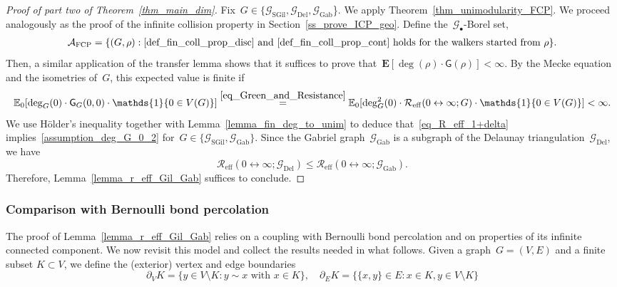 \documentclass[a4paper,11pt]{article}
\newcommand{\EE}{\mathbb{E}}
\theoremstyle{definition}
\begin{document}
\begin{proof}[Proof of part two of Theorem~\ref{thm_main_dim}]


Fix~$G \in \{\mathcal G_\mathrm{SGil},\mathcal G_\mathrm{Del},\mathcal{G}_\mathrm{Gab}$\}. We apply Theorem~\ref{thm_unimodularity_FCP}. We proceed analogously as the proof of the infinite collision property in Section~\ref{ss_prove_ICP_geo}. Define the~$\mathcal G_\bullet$-Borel set,
\begin{align*}
\mathcal A_\mathrm{FCP} = \{(G,\rho): \eqref{def_fin_coll_prop_disc} \text{ and } \eqref{def_fin_coll_prop_cont} \text{ holds for the walkers started from } \rho \}.
\end{align*}
Then, a similar application of the transfer lemma shows that it suffices to prove that~$\mathbf E[ \deg(\rho) \cdot \mathsf G(\rho) ] < \infty$. By the Mecke equation and the isometries of~$G$, this expected value is finite if
\begin{equation}\label{assumption_deg_G_0_2}
\EE_0 [ \deg_G(0) \cdot \mathsf G_G(0,0) \cdot \mathds{1}\{ 0 \in V(G) \} ] \stackrel{\eqref{eq_Green_and_Resistance}} = \EE_0 [ \deg_G^2(0) \cdot \mathcal R_\mathrm{eff}(0 \leftrightarrow \infty;G ) \cdot \mathds{1}\{ 0 \in V(G) \} ] < \infty.
\end{equation} 
We use Hölder’s inequality together with Lemma~\ref{lemma_fin_deg_to_unim} to deduce that~\eqref{eq_R_eff_1+delta} implies~\eqref{assumption_deg_G_0_2} for~$G \in \{\mathcal G_\mathrm{SGil},\mathcal{G}_\mathrm{Gab}\}$. Since the Gabriel graph~$\mathcal G_\mathrm{Gab}$ is a subgraph of the Delaunay triangulation~$\mathcal G_\mathrm{Del}$, we have
$$ \mathcal R_\mathrm{eff}(0 \leftrightarrow \infty;\mathcal G_\mathrm{Del}) \leq \mathcal R_\mathrm{eff}(0 \leftrightarrow \infty;\mathcal G_\mathrm{Gab}).$$
Therefore, Lemma~\ref{lemma_r_eff_Gil_Gab} suffices to conclude.
\end{proof}

\subsubsection{Comparison with Bernoulli bond percolation}\label{ss_comparison_Bernoulli}
The proof of Lemma~\ref{lemma_r_eff_Gil_Gab} relies on a coupling with Bernoulli bond percolation and on properties of its infinite connected component. We now revisit this model and collect the results needed in what follows. 
Given a graph~$G=(V,E)$ and a finite subset $K\subset V$, we define the (exterior) vertex and edge boundaries
\[
\partial_{V}K = \{y\in V \setminus K : y\sim x \text{ with }x\in K\},\quad \partial_{E}K=\{ \{x,y\} \in E: x\in K, y\in V \setminus K\} 
\] 
\end{document}
